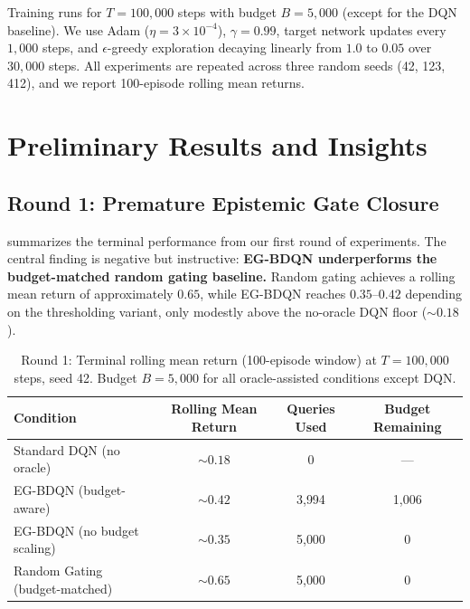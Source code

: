 \documentclass[11pt, a4paper]{article}
\begin{document}
Training runs for $T = 100{,}000$ steps with budget $B = 5{,}000$ (except for the DQN baseline). We use Adam ($\eta = 3 \times 10^{-4}$), $\gamma = 0.99$, target network updates every $1{,}000$ steps, and $\epsilon$-greedy exploration decaying linearly from $1.0$ to $0.05$ over $30{,}000$ steps. All experiments are repeated across three random seeds (42, 123, 412), and we report 100-episode rolling mean returns.


\section{Preliminary Results and Insights}
\label{sec:results}

\subsection{Round 1: Premature Epistemic Gate Closure}

 summarizes the terminal performance from our first round of experiments. The central finding is negative but instructive: \textbf{EG-BDQN underperforms the budget-matched random gating baseline.} Random gating achieves a rolling mean return of approximately $0.65$, while EG-BDQN reaches $0.35$--$0.42$ depending on the thresholding variant, only modestly above the no-oracle DQN floor ($\sim 0.18$).

\begin{table}[h]
    \centering
    \caption{Round 1: Terminal rolling mean return (100-episode window) at $T = 100{,}000$ steps, seed 42. Budget $B = 5{,}000$ for all oracle-assisted conditions except DQN.}
    \label{tab:results_r1}
    \begin{tabular}{@{} l c c c @{}}
        \toprule
        \textbf{Condition} & \textbf{Rolling Mean Return} & \textbf{Queries Used} & \textbf{Budget Remaining} \\
        \midrule
        Standard DQN (no oracle) & $\sim 0.18$ & 0 & --- \\
        EG-BDQN (budget-aware) & $\sim 0.42$ & 3{,}994 & 1{,}006 \\
        EG-BDQN (no budget scaling) & $\sim 0.35$ & 5{,}000 & 0 \\
        Random Gating (budget-matched) & $\sim 0.65$ & 5{,}000 & 0 \\
        \bottomrule
    \end{tabular}
\end{table}
\end{document}
